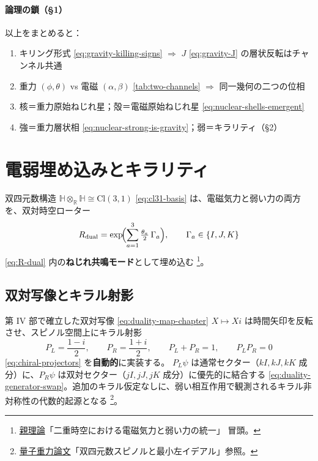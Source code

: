 \documentclass[dvipdfmx,a4paper,oneside]{jsbook}
\numberwithin{equation}{chapter}
\begin{document}
\paragraph{論理の鎖（§1）}
以上をまとめると：
\begin{enumerate}[leftmargin=2em]
  \item キリング形式 \eqref{eq:gravity-killing-signs} \(\Rightarrow\) \(J\) \eqref{eq:gravity-J} の層状反転はチャンネル共通
  \item 重力 \((\phi,\theta)\) vs 電磁 \((\alpha,\beta)\) \eqref{tab:two-channels} \(\Rightarrow\) 同一幾何の二つの位相
  \item 核＝重力原始ねじれ星；殻＝電磁原始ねじれ星 \eqref{eq:nuclear-shells-emergent}
  \item 強＝重力層状相 \eqref{eq:nuclear-strong-is-gravity}；弱＝キラリティ（§2）
\end{enumerate}

\section{電弱埋め込みとキラリティ}

双四元数構造 \(\mathbb{H} \otimes_{\mathbb{R}} \mathbb{H} \cong \mathrm{Cl}(3,1)\) \eqref{eq:cl31-basis} は、電磁気力と弱い力の両方を、双対時空ローター
\begin{equation}
  R_{\mathrm{dual}}
  = \exp\!\Bigl(\sum_{a=1}^{3} \tfrac{\theta_a}{2}\,\Gamma_a\Bigr),
  \qquad \Gamma_a \in \{I, J, K\}
  \label{eq:unif-R-dual-reminder}
\end{equation}
\eqref{eq:R-dual} 内の\textbf{ねじれ共鳴モード}として埋め込む \footnote{\hyperref[sec:sister-manuscripts]{親理論}「二重時空における電磁気力と弱い力の統一」 冒頭。}。

\subsection{双対写像とキラル射影}

第 IV 部で確立した双対写像 \eqref{eq:duality-map-chapter} \(X \mapsto Xi\) は時間矢印を反転させ、スピノル空間上にキラル射影
\begin{equation}
  P_L = \frac{1 - i}{2},
  \qquad
  P_R = \frac{1 + i}{2},
  \qquad
  P_L + P_R = 1,
  \qquad
  P_L P_R = 0
  \label{eq:unif-chiral-reminder}
\end{equation}
\eqref{eq:chiral-projectors} を\textbf{自動的}に実装する。
\(P_L \psi\) は通常セクター（\(kI, kJ, kK\) 成分）に、\(P_R \psi\) は双対セクター（\(jI, jJ, jK\) 成分）に優先的に結合する \eqref{eq:duality-generator-swap}。追加のキラル仮定なしに、弱い相互作用で観測されるキラル非対称性の代数的起源となる \footnote{\hyperref[sec:sister-manuscripts]{量子重力論文}「双四元数スピノルと最小左イデアル」参照。}。
\end{document}
